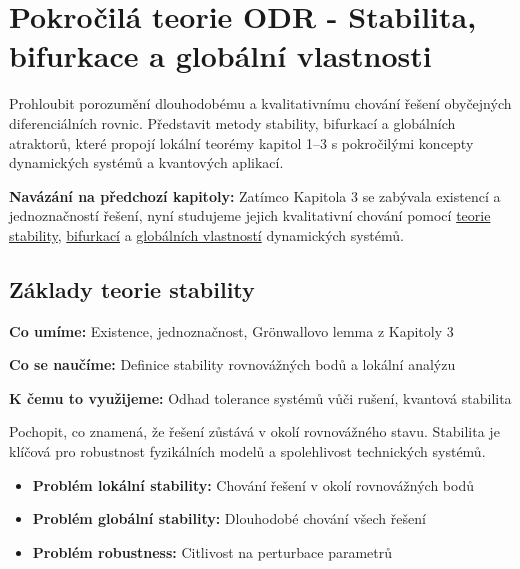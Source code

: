 \section{Pokročilá teorie ODR - Stabilita, bifurkace a globální vlastnosti}
\label{sec:pokrocila-teorie}

Prohloubit porozumění dlouhodobému a kvalitativnímu chování řešení obyčejných diferenciálních rovnic. Představit metody stability, bifurkací a globálních atraktorů, které propojí lokální teorémy kapitol 1–3 s pokročilými koncepty dynamických systémů a kvantových aplikací.

\begin{intermezzo}
\textbf{Navázání na předchozí kapitoly:} Zatímco Kapitola 3 se zabývala existencí a jednoznačností řešení, nyní studujeme jejich kvalitativní chování pomocí \hyperref[sec:zakladni-teoremy]{teorie stability}, \hyperref[sec:zakladni-teoremy]{bifurkací} a \hyperref[sec:zakladni-teoremy]{globálních vlastností} dynamických systémů.
\end{intermezzo}

\spc

\subsection{Základy teorie stability}

\begin{scaffold}
\item[] \textbf{Co umíme:} Existence, jednoznačnost, Grönwallovo lemma z Kapitoly 3
\item[] \textbf{Co se naučíme:} Definice stability rovnovážných bodů a lokální analýzu  
\item[] \textbf{K čemu to využijeme:} Odhad tolerance systémů vůči rušení, kvantová stabilita
\end{scaffold}

\begin{motivation}
Pochopit, co znamená, že řešení zůstává v okolí rovnovážného stavu. Stabilita je klíčová pro robustnost fyzikálních modelů a spolehlivost technických systémů.
\end{motivation}

\begin{itemize}
\item \textbf{Problém lokální stability:} Chování řešení v okolí rovnovážných bodů
\item \textbf{Problém globální stability:} Dlouhodobé chování všech řešení
\item \textbf{Problém robustness:} Citlivost na perturbace parametrů
\end{itemize}

